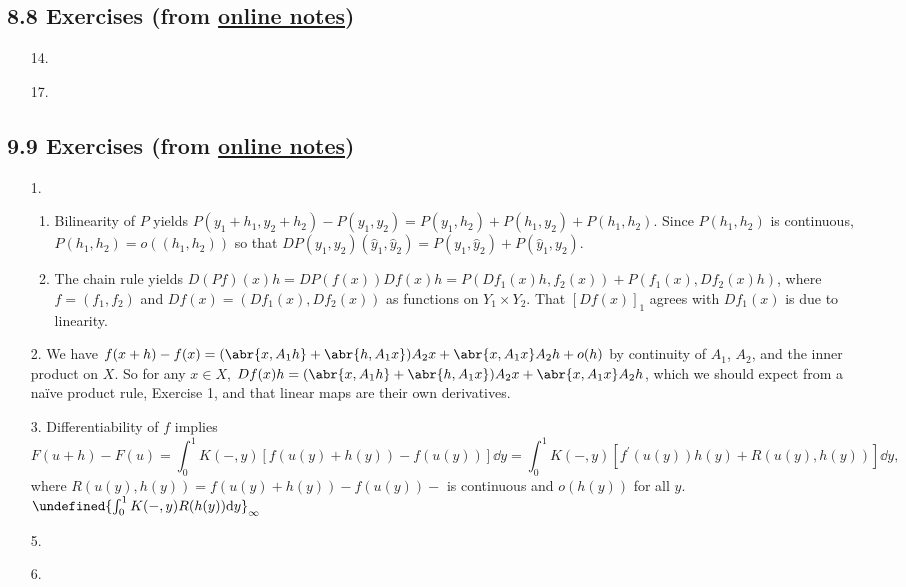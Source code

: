 \documentclass[11pt,leqno]{article}
\theoremstyle{plain}
\theoremstyle{definition}
\numberwithin{equation}{section}
\numberwithin{lem}{section}
\let\norm\undefined %
\DeclarePairedDelimiter\norm{\lVert}{\rVert}
\begin{document}
\subsection*{8.8 Exercises (from \href{https://users.oden.utexas.edu/~arbogast/appMath08c.pdf}{online notes})}
\begin{enumerate}
    \item[14.] 
    \item[17.] 
\end{enumerate}
\subsection*{9.9 Exercises (from \href{https://users.oden.utexas.edu/~arbogast/appMath08c.pdf}{online notes})}
\begin{enumerate}
    \item[1.] 
    \begin{enumerate}
        \item Bilinearity of $P$ yields $P(y_1+h_1, y_2 + h_2) - P(y_1,y_2) = P(y_1,h_2) + P(h_1,y_2) + P(h_1,h_2)$. Since $P(h_1,h_2)$ is continuous, $P(h_1,h_2) = o((h_1,h_2))$ so that $DP(y_1,y_2)(\hat y_1,\hat y_2) = P(y_1,\hat y_2) + P(\hat y_1,y_2)$.
        \item The chain rule yields $D(Pf)(x)h = DP(f(x))Df(x)h = P(Df_1(x)h, f_2(x)) + P(f_1(x),Df_2(x)h)$, where $f = (f_1,f_2)$ and $Df(x) = (Df_1(x),Df_2(x))$ as functions on $Y_1\times Y_2$. That $[Df(x)]_1$ agrees with $Df_1(x)$ is due to linearity.
    \end{enumerate}
    \item[2.] We have $f(x+h) - f(x) = (\abr{x,A_1h} + \abr{h,A_1x})A_2x + \abr{x,A_1x}A_2h + o(h)$ by continuity of $A_1$, $A_2$, and the inner product on $X$. So for any $x\in X$, $Df(x)h = (\abr{x,A_1h} + \abr{h,A_1x})A_2x + \abr{x,A_1x}A_2h$, which we should expect from a na\"ive product rule, Exercise 1, and that linear maps are their own derivatives.
    \item[3.] Differentiability of $f$ implies 
    \[F(u+h) - F(u) = \int_0^1K(-,y)[f(u(y) + h(y)) - f(u(y))]\dd y = \int_0^1K(-,y)[f^\prime(u(y))h(y) + R(u(y), h(y))]\dd y,\]
    where $R(u(y), h(y)) = f(u(y) + h(y)) - f(u(y)) - $ is continuous and $o(h(y))$ for all $y$. $\norm{\int_0^1K(-,y)R(h(y))\dd y}_\infty$
    \item[5.] 
    \item[6.] 
\end{enumerate}
\end{document}
